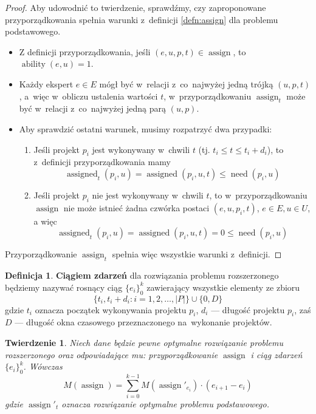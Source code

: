 \documentclass[12pt,a4paper]{article}
\newtheorem{thm}{Twierdzenie}
\theoremstyle{definition}
\newtheorem{defn}{Definicja}
\DeclareMathOperator{\ability}{ability}
\DeclareMathOperator{\need}{need}
\DeclareMathOperator{\assign}{assign}
\DeclareMathOperator{\assigned}{assigned}
\begin{document}
\begin{proof}
Aby udowodnić to twierdzenie, sprawdźmy, czy zaproponowane przyporządkowania spełnia warunki z~definicji \ref{defn:assign} dla problemu podstawowego.
\begin{itemize}
	\item Z definicji przyporządkowania, jeśli $(e, u, p, t) \in \assign$, to $\ability(e, u) = 1$.
	\item Każdy ekspert $e \in E$ mógł być w~relacji z~co~najwyżej jedną trójką $(u, p, t)$, a~więc w~obliczu ustalenia wartości $t$, w~przyporządkowaniu $\assign_t$ może być w~relacji z~co~najwyżej jedną parą $(u, p)$.
	\item Aby sprawdzić ostatni warunek, musimy rozpatrzyć dwa przypadki:
	\begin{enumerate}
		\item Jeśli projekt $p_i$ jest wykonywany w~chwili $t$ (tj. $t_i \leq t \leq t_i + d_i$), to z~definicji przyporządkowania mamy
		$$ \assigned_t(p_i, u) = \assigned(p_i, u, t) \leq \need(p_i, u) $$
		\item Jeśli projekt $p_i$ nie jest wykonywany w~chwili $t$, to w~przyporządkowaniu $\assign$ nie może istnieć żadna czwórka postaci $(e, u, p_i, t)$, $e \in E, u \in U$, a więc
		$$ \assigned_t(p_i, u) = \assigned(p_i, u, t) = 0 \leq \need(p_i, u) $$
	\end{enumerate}
\end{itemize}
Przyporządkowanie $\assign_t$ spełnia więc wszystkie warunki z~definicji.
\end{proof}

\begin{defn}
\textbf{Ciągiem zdarzeń} dla rozwiązania problemu rozszerzonego będziemy nazywać rosnący ciąg $\{e_i\}_0^k$ zawierający wszystkie elementy ze zbioru
$$ \{ t_i, t_i + d_i : i = 1, 2, \dots, |P| \} \cup \{ 0, D \} $$
gdzie $t_i$ oznacza początek wykonywania projektu $p_i$, $d_i$ --- długość projektu $p_i$, zaś $D$ --- długość okna czasowego przeznaczonego na~wykonanie projektów.
\end{defn}

\begin{thm}
Niech dane będzie pewne optymalne rozwiązanie problemu rozszerzonego oraz odpowiadające mu: przyporządkowanie $\assign$ i ciąg zdarzeń $\{e_i\}_0^k$.
Wówczas
$$ M(\assign) = \sum_{i=0}^{k-1} M(\assign'_{e_i}) \cdot (e_{i+1} - e_i) $$
gdzie $\assign'_t$ oznacza rozwiązanie optymalne problemu podstawowego.
\end{thm}
\end{document}
